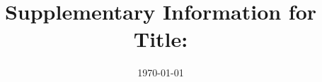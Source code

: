 \documentclass[aps,prl,preprint,superscriptaddress]{revtex4-2}
\begin{document}
\title{Supplementary Information for Title: }



\date{\today}



\pacs{}

\maketitle

\newpage


\end{document}
